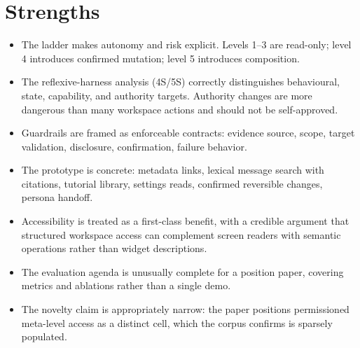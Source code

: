 \documentclass[11pt,a4paper]{article}
\begin{document}
\section{Strengths}
\begin{itemize}[leftmargin=*]
\item The ladder makes autonomy and risk explicit. Levels 1--3 are read-only; level 4 introduces confirmed mutation; level 5 introduces composition.
\item The reflexive-harness analysis (4S/5S) correctly distinguishes behavioural, state, capability, and authority targets. Authority changes are more dangerous than many workspace actions and should not be self-approved.
\item Guardrails are framed as enforceable contracts: evidence source, scope, target validation, disclosure, confirmation, failure behavior.
\item The prototype is concrete: metadata links, lexical message search with citations, tutorial library, settings reads, confirmed reversible changes, persona handoff.
\item Accessibility is treated as a first-class benefit, with a credible argument that structured workspace access can complement screen readers with semantic operations rather than widget descriptions.
\item The evaluation agenda is unusually complete for a position paper, covering metrics and ablations rather than a single demo.
\item The novelty claim is appropriately narrow: the paper positions permissioned meta-level access as a distinct cell, which the corpus confirms is sparsely populated.
\end{itemize}
\end{document}
